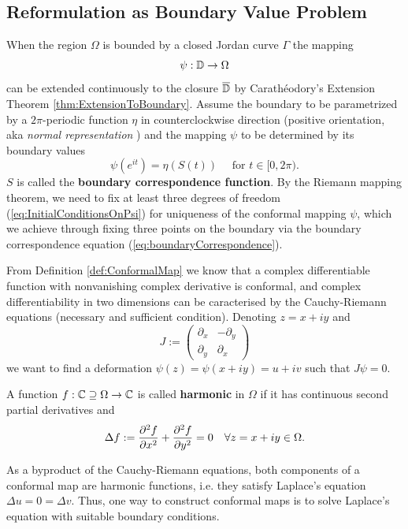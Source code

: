 \subsection{Reformulation as Boundary Value Problem}\label{chap:BoundaryValueProblems}\label{operatorK_N}

When the region $\Omega$ is bounded by a closed Jordan curve $\Gamma$ the mapping $$\psi:\mathbb{D}\to \Omega$$ can be extended continuously to the closure $\overline{\mathbb{D}}$ by Carathéodory's Extension Theorem \ref{thm:ExtensionToBoundary}. Assume the boundary to be parametrized by a $2\pi$-periodic function $\eta$ in counterclockwise direction (positive orientation, aka \textit{normal representation} \cite[page 387]{Wegmann2005_num_methods_confmapping}) and the mapping $\psi$ to be determined by its boundary values 
\begin{equation} \label{eq:boundaryCorrespondence}
    \psi(e^{it})=\eta(S(t)) \quad \text{ for } t\in[0,2\pi).
\end{equation}
$S$ is called the \textbf{boundary correspondence function}. 
By the Riemann mapping theorem, we need to fix at least three degrees of freedom (\ref{eq:InitialConditionsOnPsi}) for uniqueness of the conformal mapping $\psi$, which we achieve through fixing three points on the boundary via the boundary correspondence equation (\ref{eq:boundaryCorrespondence}).

From Definition \ref{def:ConformalMap} we know that a complex diﬀerentiable function with nonvanishing complex derivative is conformal, and complex differentiability in two dimensions can be caracterised by the Cauchy-Riemann equations (necessary and sufficient condition)\cite[Proposition 2.3]{SteinShakarchi2003_complexanalysis}.
Denoting $z=x+iy$ and
$$J:= \begin{pmatrix}
    \partial_x & -\partial_y \\
    \partial_y & \partial_x
\end{pmatrix}$$
we want to find a deformation $\psi(z)=\psi(x+iy)= u+iv$ such that $J\psi = 0$.

\begin{definition} 
A function $f:\mathbb{C}\supseteq\Omega\to\mathbb{C}$ is called \textbf{harmonic} in $\Omega$ if it has continuous second partial derivatives and $$\Delta f:= \frac{\partial^2 f}{\partial x^2}+\frac{\partial^2 f}{\partial y^2}=0 \quad \forall z=x+iy\in\Omega.$$
\end{definition}
As a byproduct of the Cauchy-Riemann equations, both components of a conformal map are harmonic functions, i.e. they satisfy Laplace's equation $\Delta u = 0 = \Delta v$.
Thus, one way to construct conformal maps is to solve Laplace's equation with suitable boundary conditions.

